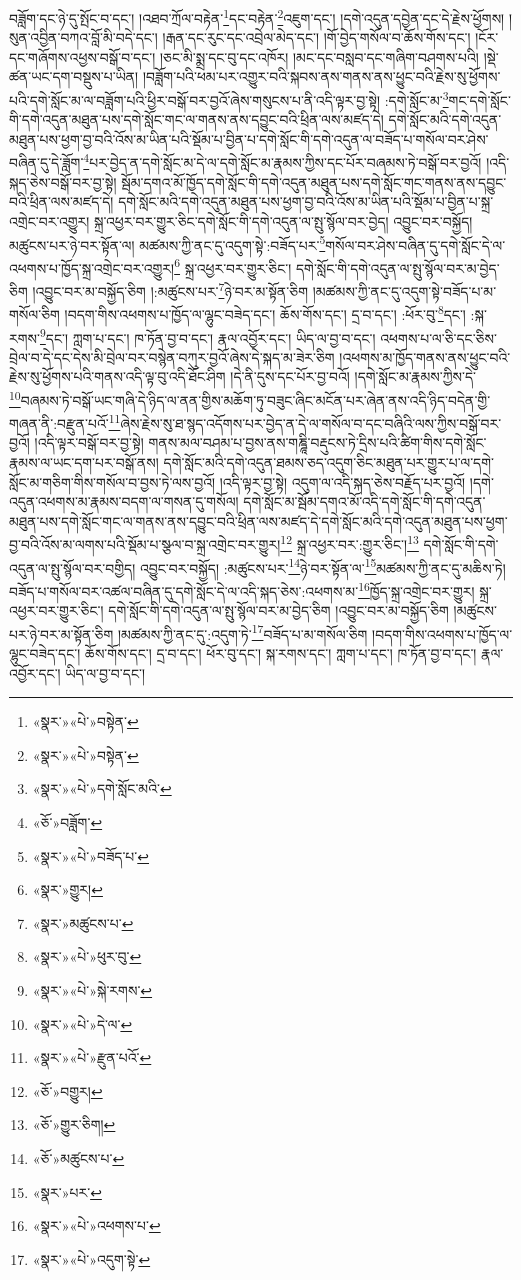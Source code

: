 བཟློག་དང་ཉེ་དུ་སྤོང་བ་དང་། །འཐབ་ཀྲོལ་བརྟེན་\footnote{«སྣར་»«པེ་»བསྟེན་}དང་བརྟེན་\footnote{«སྣར་»«པེ་»བསྟེན་}འཇུག་དང་། །དགེ་འདུན་དབྱེན་དང་དེ་རྗེས་ཕྱོགས། །སུན་འབྱིན་བཀའ་བློ་མི་བདེ་དང་། །རྒན་དང་རུང་དང་འབྲེལ་མེད་དང་། །གོ་བྱེད་གསོལ་བ་ཆོས་གོས་དང་། །ངོར་དང་གཞོགས་འཕྱས་བསྒོ་བ་དང་། །ཅང་མི་སྨྲ་དང་བུ་དང་འཁོར། །མང་དང་བསླབ་དང་གཞིག་བཤགས་པའི། །སྡེ་ཚན་ཡང་དག་བསྡུས་པ་ཡིན། །བཟློག་པའི་ཕམ་པར་འགྱུར་བའི་སྐབས་ནས་གནས་ནས་ཕྱུང་བའི་རྗེས་སུ་ཕྱོགས་པའི་དགེ་སློང་མ་ལ་བཟློག་པའི་ཕྱིར་བསྒོ་བར་བྱའོ་ཞེས་གསུངས་པ་ནི་འདི་ལྟར་བྱ་སྟེ། :དགེ་སློང་མ་\footnote{«སྣར་»«པེ་»དགེ་སློང་མའི་}གང་དགེ་སློང་གི་དགེ་འདུན་མཐུན་པས་དགེ་སློང་གང་ལ་གནས་ནས་དབྱུང་བའི་ཕྲིན་ལས་མཛད་དེ། དགེ་སློང་མའི་དགེ་འདུན་མཐུན་པས་ཕྱག་བྱ་བའི་འོས་མ་ཡིན་པའི་སྡོམ་པ་བྱིན་པ་དགེ་སློང་གི་དགེ་འདུན་ལ་བཟོད་པ་གསོལ་བར་ཤེས་བཞིན་དུ་དེ་ཟློག་\footnote{«ཅོ་»བཟློག་}པར་བྱེད་ན་དགེ་སློང་མ་དེ་ལ་དགེ་སློང་མ་རྣམས་ཀྱིས་དང་པོར་བཞམས་ཏེ་བསྒོ་བར་བྱའོ། །འདི་སྐད་ཅེས་བསྒོ་བར་བྱ་སྟེ། སྦོམ་དགའ་མོ་ཁྱོད་དགེ་སློང་གི་དགེ་འདུན་མཐུན་པས་དགེ་སློང་གང་གནས་ནས་དབྱུང་བའི་ཕྲིན་ལས་མཛད་དེ། དགེ་སློང་མའི་དགེ་འདུན་མཐུན་པས་ཕྱག་བྱ་བའི་འོས་མ་ཡིན་པའི་སྡོམ་པ་བྱིན་པ་སྐྲ་འགྲེང་བར་འགྱུར། སྐྲ་འཕྱར་བར་གྱུར་ཅིང་དགེ་སློང་གི་དགེ་འདུན་ལ་སྤུ་སྙོལ་བར་བྱེད། འབྱུང་བར་བསྐྱོད། མཚུངས་པར་ཉེ་བར་སྟོན་ལ། མཚམས་ཀྱི་ནང་དུ་འདུག་སྟེ་:བཟོད་པར་\footnote{«སྣར་»«པེ་»བཟོད་པ་}གསོལ་བར་ཤེས་བཞིན་དུ་དགེ་སློང་དེ་ལ་འཕགས་པ་ཁྱོད་སྐྲ་འགྲེང་བར་འགྱུར།\footnote{«སྣར་»གྱུར།} སྐྲ་འཕྱར་བར་གྱུར་ཅིང་། དགེ་སློང་གི་དགེ་འདུན་ལ་སྤུ་སྙོལ་བར་མ་བྱེད་ཅིག །འབྱུང་བར་མ་བསྐྱོད་ཅིག །:མཚུངས་པར་\footnote{«སྣར་»མཚུངས་པ་}ཉེ་བར་མ་སྟོན་ཅིག །མཚམས་ཀྱི་ནང་དུ་འདུག་སྟེ་བཟོད་པ་མ་གསོལ་ཅིག །བདག་གིས་འཕགས་པ་ཁྱོད་ལ་ལྷུང་བཟེད་དང་། ཆོས་གོས་དང་། དྲ་བ་དང་། :ཕོར་བུ་\footnote{«སྣར་»«པེ་»ཕུར་བུ་}དང་། :སྐ་རགས་\footnote{«སྣར་»«པེ་»སྐེ་རགས་}དང་། ཀླག་པ་དང་། ཁ་ཏོན་བྱ་བ་དང་། རྣལ་འབྱོར་དང་། ཡིད་ལ་བྱ་བ་དང་། འཕགས་པ་ལ་ཅི་དང་ཅིས་བྲེལ་བ་དེ་དང་དེས་མི་བྲེལ་བར་བསྙེན་བཀུར་བྱའོ་ཞེས་དེ་སྐད་མ་ཟེར་ཅིག །འཕགས་མ་ཁྱོད་གནས་ནས་ཕྱུང་བའི་རྗེས་སུ་ཕྱོགས་པའི་གནས་འདི་ལྟ་བུ་འདི་ཐོང་ཤིག །དེ་ནི་དུས་དང་པོར་བྱ་བའོ། །དགེ་སློང་མ་རྣམས་ཀྱིས་དེ་\footnote{«སྣར་»«པེ་»དེ་ལ་}བཞམས་ཏེ་བསྒོ་ཡང་གཞི་དེ་ཉིད་ལ་ནན་གྱིས་མཆོག་ཏུ་བཟུང་ཞིང་མངོན་པར་ཞེན་ནས་འདི་ཉིད་བདེན་གྱི་གཞན་ནི་:བརྫུན་པའོ་\footnote{«སྣར་»«པེ་»རྫུན་པའོ་}ཞེས་རྗེས་སུ་ཐ་སྙད་འདོགས་པར་བྱེད་ན་དེ་ལ་གསོལ་བ་དང་བཞིའི་ལས་ཀྱིས་བསྒོ་བར་བྱའོ། །འདི་ལྟར་བསྒོ་བར་བྱ་སྟེ། གནས་མལ་བཤམ་པ་བྱས་ནས་གཎྜཱི་བརྡུངས་ཏེ་དྲིས་པའི་ཚིག་གིས་དགེ་སློང་རྣམས་ལ་ཡང་དག་པར་བསྒོ་ནས། དགེ་སློང་མའི་དགེ་འདུན་ཐམས་ཅད་འདུག་ཅིང་མཐུན་པར་གྱུར་པ་ལ་དགེ་སློང་མ་གཅིག་གིས་གསོལ་བ་བྱས་ཏེ་ལས་བྱའོ། །འདི་ལྟར་བྱ་སྟེ། འདུག་ལ་འདི་སྐད་ཅེས་བརྗོད་པར་བྱའོ། །དགེ་འདུན་འཕགས་མ་རྣམས་བདག་ལ་གསན་དུ་གསོལ། དགེ་སློང་མ་སྦོམ་དགའ་མོ་འདི་དགེ་སློང་གི་དགེ་འདུན་མཐུན་པས་དགེ་སློང་གང་ལ་གནས་ནས་དབྱུང་བའི་ཕྲིན་ལས་མཛད་དེ་དགེ་སློང་མའི་དགེ་འདུན་མཐུན་པས་ཕྱག་བྱ་བའི་འོས་མ་ལགས་པའི་སྡོམ་པ་སྩལ་བ་སྐྲ་འགྲེང་བར་གྱུར།\footnote{«ཅོ་»བགྱུར།} སྐྲ་འཕྱར་བར་:གྱུར་ཅིང་།\footnote{«ཅོ་»གྱུར་ཅིག།} དགེ་སློང་གི་དགེ་འདུན་ལ་སྤུ་སྙོལ་བར་བགྱིད། འབྱུང་བར་བསྐྱོད། :མཚུངས་པར་\footnote{«ཅོ་»མཚུངས་པ་}ཉེ་བར་སྟོན་ལ་\footnote{«སྣར་»པར་}མཚམས་ཀྱི་ནང་དུ་མཆིས་ཏེ། བཟོད་པ་གསོལ་བར་འཚལ་བཞིན་དུ་དགེ་སློང་དེ་ལ་འདི་སྐད་ཅེས་:འཕགས་མ་\footnote{«སྣར་»«པེ་»འཕགས་པ་}ཁྱོད་སྐྲ་འགྲེང་བར་གྱུར། སྐྲ་འཕྱར་བར་གྱུར་ཅིང་། དགེ་སློང་གི་དགེ་འདུན་ལ་སྤུ་སྙོལ་བར་མ་བྱེད་ཅིག །འབྱུང་བར་མ་བསྐྱོད་ཅིག །མཚུངས་པར་ཉེ་བར་མ་སྟོན་ཅིག །མཚམས་ཀྱི་ནང་དུ་:འདུག་ཏེ་\footnote{«སྣར་»«པེ་»འདུག་སྟེ་}བཟོད་པ་མ་གསོལ་ཅིག །བདག་གིས་འཕགས་པ་ཁྱོད་ལ་ལྷུང་བཟེད་དང་། ཆོས་གོས་དང་། དྲ་བ་དང་། ཕོར་བུ་དང་། སྐ་རགས་དང་། ཀླག་པ་དང་། ཁ་ཏོན་བྱ་བ་དང་། རྣལ་འབྱོར་དང་། ཡིད་ལ་བྱ་བ་དང་། 